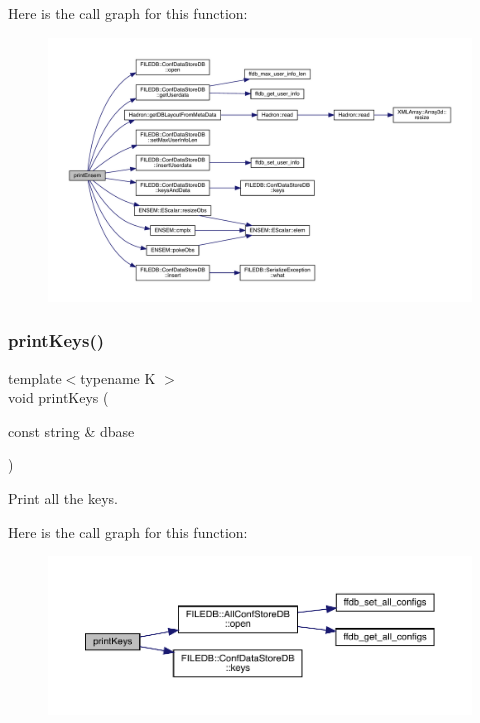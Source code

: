 Here is the call graph for this function\+:
\nopagebreak
\begin{figure}[H]
\begin{center}
\leavevmode
\includegraphics[width=350pt]{d4/d74/adat-devel_2main_2dbutil_2dbgraph__convert_8cc_a6fc5db26f2d2594d2601479adfa9dc32_cgraph}
\end{center}
\end{figure}
\mbox{\label{adat-devel_2main_2dbutil_2dbgraph__convert_8cc_a05c6483ffb9fa71112b451a5dd7eb935}} 
\subsubsection{\texorpdfstring{printKeys()}{printKeys()}}
{\footnotesize\ttfamily template$<$typename K $>$ \\
void print\+Keys (\begin{DoxyParamCaption}\item[{const string \&}]{dbase }\end{DoxyParamCaption})}



Print all the keys. 

Here is the call graph for this function\+:
\nopagebreak
\begin{figure}[H]
\begin{center}
\leavevmode
\includegraphics[width=350pt]{d4/d74/adat-devel_2main_2dbutil_2dbgraph__convert_8cc_a05c6483ffb9fa71112b451a5dd7eb935_cgraph}
\end{center}
\end{figure}
\mbox{\label{adat-devel_2main_2dbutil_2dbgraph__convert_8cc_a44428d59560cb466420c5c0ca60315e5}} 
